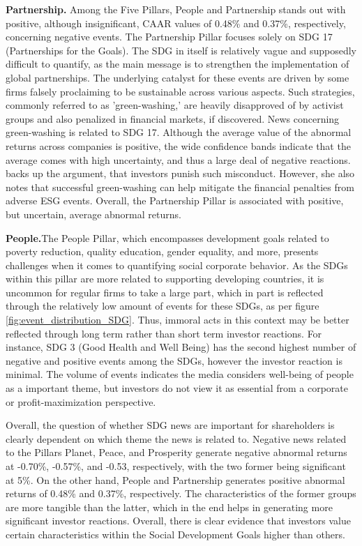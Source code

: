 \textbf{Partnership.} Among the Five Pillars, People and Partnership stands out with positive, although insignificant, CAAR values of 0.48\% and 0.37\%, respectively, concerning negative events.
The Partnership Pillar focuses solely on SDG 17 (Partnerships for the Goals). The SDG in itself is relatively vague and supposedly difficult to quantify, as the main message is to strengthen the implementation of global partnerships. The underlying catalyst for these events are driven by some firms falsely proclaiming to be sustainable across various aspects. Such strategies, commonly referred to as 'green-washing,' are heavily disapproved of by activist groups and also penalized in financial markets, if discovered. News concerning green-washing is related to SDG 17. Although the average value of the abnormal returns across companies is positive, the wide confidence bands indicate that the average comes with high uncertainty, and thus a large deal of negative reactions.  \cite{Blancard_ESG_sentiment} backs up the argument, that investors punish such misconduct. However, she also notes that successful green-washing can help mitigate the financial penalties from adverse ESG events. Overall, the Partnership Pillar is associated with positive, but uncertain, average abnormal returns. 

\textbf{People.}The People Pillar, which encompasses development goals related to poverty reduction, quality education, gender equality, and more, presents challenges when it comes to quantifying social corporate behavior. As the SDGs within this pillar are more related to supporting developing countries, it is uncommon for regular firms to take a large part, which in part is reflected through the relatively low amount of events for these SDGs, as per figure \ref{fig:event_distribution_SDG}. Thus, immoral acts in this context may be better reflected through long term rather than short term investor reactions. For instance, SDG 3 (Good Health and Well Being) has the second highest number of negative and positive events among the SDGs, however the investor reaction is minimal. The volume of events indicates the media considers well-being of people as a important theme, but investors do not view it as essential from a corporate or profit-maximization perspective.   

Overall, the question of whether SDG news are important for shareholders is clearly dependent on which theme the news is related to. Negative news related to the Pillars Planet, Peace, and Prosperity generate negative abnormal returns at -0.70\%, -0.57\%, and -0.53, respectively, with the two former being significant at 5\%. On the other hand, People and Partnership generates positive abnormal returns of 0.48\% and 0.37\%, respectively. The characteristics of the former groups are more tangible than the latter, which in the end helps in generating more significant investor reactions. Overall, there is clear evidence that investors value certain characteristics within the Social Development Goals higher than others. 

